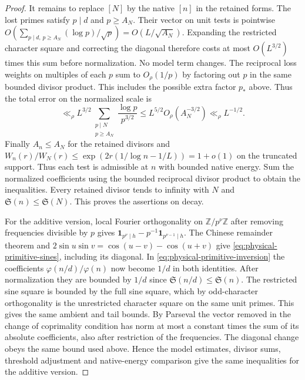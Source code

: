 \documentclass[11pt,a4paper]{article}
\numberwithin{equation}{section}
\newcommand{\SSS}{\mathfrak S}
\begin{document}
\begin{proof}
It remains to replace $[N]$ by the native $[n]$ in the retained
forms. The lost primes satisfy $p\mid d$ and $p\ge A_N$.
Their vector on unit tests is pointwise
$O(\sum_{p\mid d,\,p\ge A_N}(\log p)/\sqrt p)=O(L/\sqrt{A_N})$.
Expanding the restricted character square and correcting the
diagonal therefore costs at most $O(L^{3/2})$ times this sum
before normalization. No model term changes. The reciprocal
loss weights on multiples of each $p$ sum to $O_\rho(1/p)$
by factoring out $p$ in the same bounded divisor product.
This includes the possible extra factor $p_*$ above. Thus the
total error on the normalized scale is
\[
 \ll_\rho L^{3/2}\sum_{\substack{p\mid N\\p\ge A_N}}
                  \frac{\log p}{p^{3/2}}
 \le L^{5/2}O_\rho(A_N^{-3/2})\ll_\rho L^{-1/2}.
\]
Finally $A_n\le A_N$ for the retained divisors and
$W_n(r)/W_N(r)\le\exp(2r(1/\log n-1/L))=1+o(1)$ on the
truncated support. Thus each test is admissible at $n$ with
bounded native energy. Sum the normalized coefficients using
the bounded reciprocal divisor product to obtain the inequalities.
Every retained divisor tends to infinity with $N$ and
$\SSS(n)\le\SSS(N)$. This proves the assertions on decay.

For the additive version, local Fourier orthogonality on
$\mathbb Z/p^\nu\mathbb Z$ after removing frequencies divisible
by $p$ gives $\mathbf1_{p^\nu\mid h}-p^{-1}\mathbf1_{p^{\nu-1}\mid h}$.
The Chinese remainder theorem and
$2\sin u\sin v=\cos(u-v)-\cos(u+v)$ give
\eqref{eq:physical-primitive-sines}, including its diagonal.
In \eqref{eq:physical-primitive-inversion} the coefficients
$\varphi(n/d)/\varphi(n)$ now become $1/d$ in both identities.
After normalization they are bounded by $1/d$ since
$\SSS(n/d)\le\SSS(n)$. The restricted sine square is bounded
by the full sine square, which by odd-character orthogonality
is the unrestricted character square on the same unit primes.
This gives the same ambient and tail bounds. By Parseval the
vector removed in the change of coprimality condition has norm
at most a constant times the sum of its absolute coefficients,
also after restriction of the frequencies. The diagonal change
obeys the same bound used above. Hence the model estimates,
divisor sums, threshold adjustment and native-energy comparison
give the same inequalities for the additive version.
\end{proof}
\end{document}

